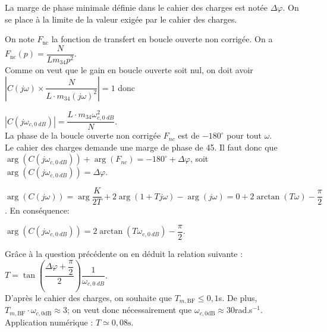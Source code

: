 La marge de phase minimale définie dans le cahier des charges est notée $\Delta \varphi$. On se place à la limite de la valeur exigée par le cahier des charges.
\fi

\ifprof
\begin{corrige}
On note $F_{\text{nc}}$  la fonction de transfert en boucle ouverte non corrigée. On a $F_{\text{nc}}(p)=\dfrac{N}{Lm_{34}p^2}$.\\

Comme on veut que le gain en boucle ouverte soit nul, on doit avoir $\left|  C(j\omega)\times \dfrac{N}{L\cdot m_{34}(j\omega)^2}\right| = 1$ donc 

$\boxed{\left| C\left(j\omega_{c,\SI{0}{dB}}\right)\right| = \dfrac{L\cdot m_{34}\omega_{c,\SI{0}{dB}}^2}{N}}$.\\

La phase de la boucle ouverte non corrigée $F_{nc}$ est de $-180^{\circ}$ pour tout $\omega$.\\

Le cahier des charges demande une marge de phase de 45\degres. Il faut donc que 
$\arg\left(C\left(j\omega_{c,\SI{0}{dB}}\right)\right) + \arg(F_{nc}) =-180^{\circ} + \Delta\varphi$,
soit $\boxed{\arg\left(C\left(j\omega_{c,\SI{0}{dB}}\right)\right)=\Delta\varphi}$.
\end{corrige}
\else
\fi

\ifprof
\begin{corrige}
$\arg\left(C\left(j\omega\right)\right)=\arg{\dfrac{K}{2T}}+2\arg\left(1+Tj\omega\right)-\arg(j\omega)=0+2\arctan\left(T\omega\right)-\dfrac{\pi}{2}$. En conséquence:
  
$\arg\left(C\left(j\omega_{c,\SI{0}{dB}}\right)\right) = 2\arctan\left(T\omega_{c,\SI{0}{dB}}\right)-\dfrac{\pi}{2}$.

Grâce à la question précédente on en déduit la relation suivante : $\boxed{T=\tan\left(\dfrac{\Delta\varphi+\dfrac{\pi}{2}}{2}\right) \dfrac{1}{\omega_{c,\SI{0}{dB}}}}$.\\
D'après le cahier des charges, on souhaite que $T_{m,\text{BF}}\leq 0,1$s. De plus, $T_{m,\text{BF}}\cdot \omega_{c,0\text{dB}} \approx 3$; on veut donc nécessairement que $\omega_{c,0\text{dB}}\approx 30$rad.s$^{-1}$.\\
Application numérique : $\boxed{T \simeq 0,08\text{s}}$.

\end{corrige}
\else
\fi

